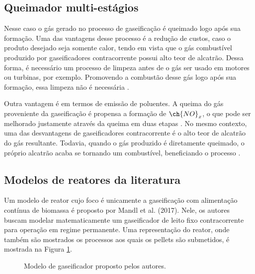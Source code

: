 \subsection{Queimador multi-estágios}
Nesse caso o gás gerado no processo de gaseificação é queimado logo após sua formação. Uma das vantagens desse processo é a redução de custos, caso o produto desejado seja somente calor, tendo em vista que o gás combustível produzido por gaseificadores contracorrente possui alto teor de alcatrão. Dessa forma, é necessário um processo de limpeza antes de o gás ser usado em motores ou turbinas, por exemplo. Promovendo a combustão desse gás logo após sua formação, essa limpeza não é necessária \cite{Scharler2011}.

Outra vantagem é em termos de emissão de poluentes. A queima do gás proveniente da gaseificação é propensa a formação de $\ch{NO}_x$, o que pode ser melhorado justamente através da queima em duas etapas \cite{Scharler2011} \cite{Kirch2018}. No mesmo contexto, uma das desvantagens de gaseificadores contracorrente é o alto teor de alcatrão do gás resultante. Todavia, quando o gás produzido é diretamente queimado, o próprio alcatrão acaba se tornando um combustível, beneficiando o processo \cite{Brunner2017}.

\subsection{Modelos de reatores da literatura}

Um modelo de reator cujo foco é unicamente a gaseificação com alimentação contínua de biomassa é proposto por Mandl et al. (2017). Nele, os autores buscam modelar matematicamente um gaseificador de leito fixo contracorrente para operação em regime permanente. Uma representação do reator, onde também são mostrados os processos aos quais os pellets são submetidos, é mostrada na Figura \ref{fig:mandl}.

\begin{figure}[!ht]
	\centering
	\caption{Modelo de gaseificador proposto pelos autores.}
	\label{fig:mandl}
\end{figure}

